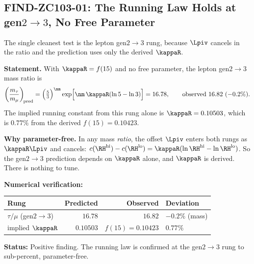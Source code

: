 \documentclass[12pt, a4paper]{article}
\begin{document}
\newpage

\subsection{FIND-ZC103-01: The Running Law Holds at gen$2{\to}3$, No Free Parameter}
\label{sec:positive-zc103}

The single cleanest test is the lepton gen$2{\to}3$ rung, because $\Lpiv$
cancels in the ratio and the prediction uses only the derived $\kappaR$.


\begin{formalbox}[title={FIND-ZC103-01: $\tau/\mu$ from $f(15)$ alone ($R_1$, numerical)}]

\textbf{Statement.} With $\kappaR=f(15)$ and no free parameter, the lepton
gen$2{\to}3$ mass ratio is
\[
  \left(\frac{m_\tau}{m_\mu}\right)_{\!\rm pred}
   = \Big(\tfrac{5}{3}\Big)^{\nm}\exp\!\Big[\nm\,\kappaR(\ln 5-\ln 3)\Big]
   = 16.78,
  \qquad \text{observed } 16.82\ (-0.2\%).
\]
The implied running constant from this rung alone is $\kappaR=0.10503$, which is
$0.77\%$ from the derived $f(15)=0.10423$.

\textbf{Why parameter-free.} In any mass \emph{ratio}, the offset $\Lpiv$
enters both rungs as $\kappaR\Lpiv$ and cancels:
$c(\RH^{\rm hi})-c(\RH^{\rm lo})=\kappaR(\ln\RH^{\rm hi}-\ln\RH^{\rm lo})$.
So the gen$2{\to}3$ prediction depends on $\kappaR$ alone, and $\kappaR$ is
derived. There is nothing to tune.

\textbf{Numerical verification:}
\begin{center}
{\small\renewcommand{\arraystretch}{1.25}
\begin{tabular}{@{}lrrl@{}}
\toprule
Rung & Predicted & Observed & Deviation \\
\midrule
$\tau/\mu$ (gen$2{\to}3$) & $16.78$ & $16.82$ & $-0.2\%$ (mass) \\
implied $\kappaR$         & $0.10503$ & $f(15)=0.10423$ & $0.77\%$ \\
\bottomrule
\end{tabular}}
\end{center}

\textbf{Status:} Positive finding. The running law is confirmed at the
gen$2{\to}3$ rung to sub-percent, parameter-free.
\end{formalbox}
\end{document}
